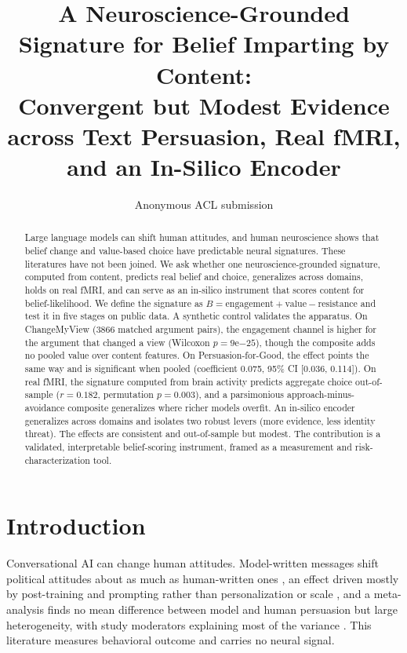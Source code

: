 \documentclass[11pt]{article}
\title{A Neuroscience-Grounded Signature for Belief Imparting by Content:\\
Convergent but Modest Evidence across Text Persuasion, Real fMRI, and an In-Silico Encoder}
\author{Anonymous ACL submission}
\begin{document}
\maketitle

\begin{abstract}
Large language models can shift human attitudes, and human neuroscience shows that belief change and
value-based choice have predictable neural signatures. These literatures have not been joined. We ask
whether one neuroscience-grounded signature, computed from content, predicts real belief and choice,
generalizes across domains, holds on real fMRI, and can serve as an in-silico instrument that scores
content for belief-likelihood. We define the signature as $B = \text{engagement} + \text{value} -
\text{resistance}$ and test it in five stages on public data. A synthetic control validates the apparatus.
On ChangeMyView (3866 matched argument pairs), the engagement channel is higher for the argument that
changed a view (Wilcoxon $p = 9\mathrm{e}{-25}$), though the composite adds no pooled value over content
features. On Persuasion-for-Good, the effect points the same way and is significant when pooled
(coefficient 0.075, 95\% CI [0.036, 0.114]). On real fMRI, the signature computed from brain activity
predicts aggregate choice out-of-sample ($r = 0.182$, permutation $p = 0.003$), and a parsimonious
approach-minus-avoidance composite generalizes where richer models overfit. An in-silico encoder
generalizes across domains and isolates two robust levers (more evidence, less identity threat). The
effects are consistent and out-of-sample but modest. The contribution is a validated, interpretable
belief-scoring instrument, framed as a measurement and risk-characterization tool.
\end{abstract}

\section{Introduction}
Conversational AI can change human attitudes. Model-written messages shift political attitudes about as
much as human-written ones \citep{bai2025llm}, an effect driven mostly by post-training and prompting
rather than personalization or scale \citep{hackenburg2025levers, argyle2025testing}, and a meta-analysis
finds no mean difference between model and human persuasion but large heterogeneity, with study moderators
explaining most of the variance \citep{holbling2025meta}. This literature measures behavioral outcome and
carries no neural signal.
\end{document}
